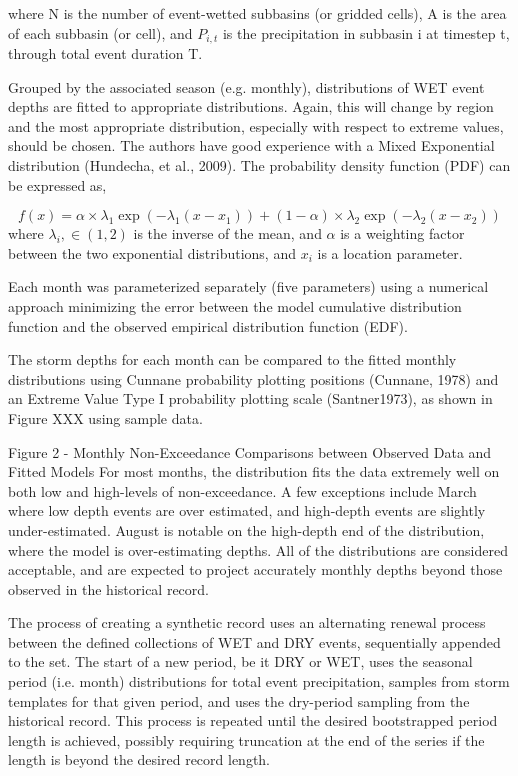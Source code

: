 \documentclass[11pt]{article} %
\begin{document}
where N is the number of event-wetted subbasins (or gridded cells), A is the area of each subbasin (or cell), and $P_{i,t}$ is the precipitation in subbasin i at timestep t, through total event duration T. 

Grouped by the associated season (e.g. monthly), distributions of WET event depths are fitted to appropriate distributions. Again, this will change by region and the most appropriate distribution, especially with respect to extreme values, should be chosen. The authors have good experience with a Mixed Exponential distribution (Hundecha, et al., 2009). The probability density function (PDF) can be expressed as,

\begin{equation}
f(x)=\alpha\times\lambda_1 \exp(-\lambda_1 (x-x_1))+(1-\alpha)\times\lambda_2 \exp(-\lambda_2 (x-x_2))
\end{equation}
where $\lambda_i ,\in(1,2)$ is the inverse of the mean, and $\alpha$ is a weighting factor between the two exponential distributions, and $x_i$ is a location parameter.

Each month was parameterized separately (five parameters) using a numerical approach minimizing the error between the model cumulative distribution function and the observed empirical distribution function (EDF). 

The storm depths for each month can be compared to the fitted monthly distributions using Cunnane probability plotting positions (Cunnane, 1978) and an Extreme Value Type I probability plotting scale (Santner1973), as shown in Figure XXX using sample data. 

 
Figure 2 - Monthly Non-Exceedance Comparisons between Observed Data and Fitted Models
For most months, the distribution fits the data extremely well on both low and high-levels of non-exceedance. A few exceptions include March where low depth events are over estimated, and high-depth events are slightly under-estimated. August is notable on the high-depth end of the distribution, where the model is over-estimating depths. All of the distributions are considered acceptable, and are expected to project accurately monthly depths beyond those observed in the historical record.

The process of creating a synthetic record uses an alternating renewal process between the defined collections of WET and DRY events, sequentially appended to the set. The start of a new period, be it DRY or WET, uses the seasonal period (i.e. month) distributions for total event precipitation, samples from storm templates for that given period, and uses the dry-period sampling from the historical record. This process is repeated until the desired bootstrapped period length is achieved, possibly requiring truncation at the end of the series if the length is beyond the desired record length.
\end{document}
